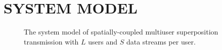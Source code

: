 \documentclass[conference]{IEEEtran}
\begin{document}




\section{SYSTEM MODEL}
\begin{figure}[ht]
\vspace{-2em}
\setlength{\abovecaptionskip}{-0cm}
\setlength{\belowcaptionskip}{-1cm}
  \caption{The system model of spatially-coupled multiuser superposition transmission with $L$ users and $S$ data streams per user.}\label{fig.1}
    \vspace{-2em}
\end{figure}
\end{document}
